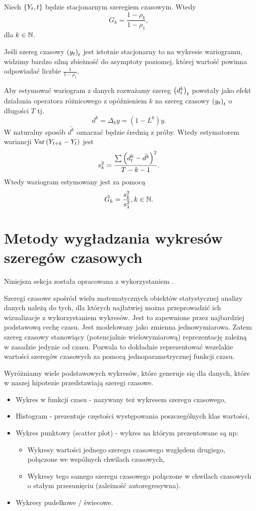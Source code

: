 \documentclass[10pt,a4paper]{book}
\begin{document}
\begin{proposition}
Niech $\left\lbrace {{Y_t}, {t}} \right\rbrace$ będzie stacjonarnym szeregiem czasowym. Wtedy 
$$
G_k = \frac{1-\rho_k}{1-\rho_1},
$$
dla $k \in \mathbb{N}$.
\end{proposition}
Jeśli szereg czasowy $\left( {y_t} \right)_{t}^{} $ jest istotnie stacjonarny to na wykresie wariogramu, widzimy bardzo silną zbieżność do asymptoty poziomej, której wartość powinna odpowiadać liczbie $\frac{1}{1-\rho_1}$.
\begin{definition}
 Aby estymować wariogram z danych rozważamy szereg $\left( {d^k_t} \right)_{t}^{} $ powstały jako efekt działania operatora różnicowego z opóźnieniem $k$ na szereg czasowy $\left( {y_t} \right)_{t}^{} $ o długości $T$ tj.
$$
d^k = \Delta_k y = (1- L^k) y.
$$ 
W naturalny sposób $\bar{d^k}$ oznaczać będzie średnią z próby. Wtedy estymatorem wariancji $\operatorname{Var} \left( {Y_{t+k} - Y_t} \right)$ jest 
$$
s_k^2 = \frac{ \sum \bracket{d^k_t - \bar{d^k}}^2  }{T-k-1}.
$$
Wtedy wariogram estymowany jest za pomocą 
$$
\hat{G_k} = \frac{s_k^2}{s_1^2}, k \in \mathbb{N}.
$$
\end{definition}

\chapter{Metody wygładzania wykresów szeregów czasowych}

Niniejsza sekcja została opracowana z wykorzystaniem \citep{montgomery2015introduction}.

Szeregi czasowe spośród wielu matematycznych obiektów statystycznej analizy danych należą do tych, dla których najłatwiej można przeprowadzić ich wizualizacje z wykorzystaniem wykresów. Jest to zapewnione przez najbardziej podstawową cechę czasu. Jest modelowany jako zmienna jednowymiarowa. Zatem szereg czasowy stanowiący (potencjalnie wielowymiarową) reprezentację zależną w zasadzie jedynie od czasu. Pozwala to dokładnie reprezentować wszelakie wartości szeregów czasowych za pomocą jednoparametrycznej funkcji czasu. 

Wyróżniamy wiele podstawowych wykresów, które generuje się dla danych, które w naszej hipotezie przedstawiają szeregi czasowe.
\begin{itemize}
\item Wykres w funkcji czasu - nazywany też wykresem szeregu czasowego,
\item Histogram - prezentuje częstości występowania poszczególnych klas wartości,
\item Wykres punktowy (scatter plot) - wykres na którym prezentowane są np:
\begin{itemize}
\item Wykresy wartości jednego szeregu czasowego względem drugiego, połączone we wspólnych chwilach czasowych,
\item Wykresy tego samego szeregu czasowego połączone w chwilach czasowych o stałym przesunięciu (zależność autoregresywna).
\end{itemize}
\item Wykresy pudełkowe / świecowe.
\end{itemize}
\end{document}
